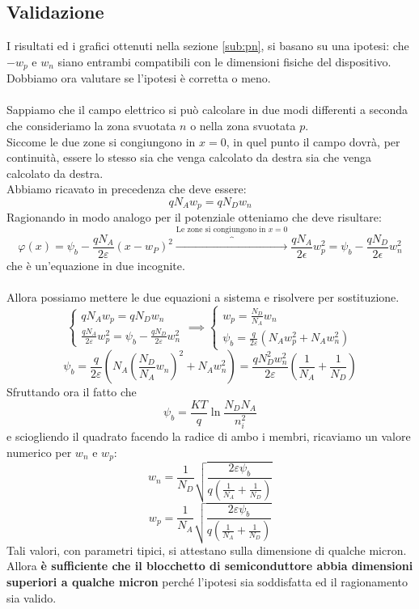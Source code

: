 \documentclass[../main.tex]{subfiles}
\begin{document}
	\subsection{Validazione}
	I risultati ed i grafici ottenuti nella sezione \ref{sub:pn}, si basano su una ipotesi: che $-w_p$ e $w_n$ siano entrambi compatibili con le dimensioni fisiche del dispositivo. \\
	Dobbiamo ora valutare se l’ipotesi è corretta o meno.\\\\
	Sappiamo che il campo elettrico si può calcolare in due modi differenti a seconda che consideriamo la zona svuotata $n$ o nella zona svuotata $p$. \\
	Siccome le due zone si congiungono in $x = 0$, in quel punto il campo dovrà, per continuità, essere lo stesso sia che venga calcolato da destra sia che venga calcolato da destra. \\
	Abbiamo ricavato in precedenza che deve essere:
	$$qN_A w_p = qN_D w_n$$
	Ragionando in modo analogo per il potenziale otteniamo che deve risultare:
	$$\varphi(x)=\psi_{b}-\frac{qN_{A}}{2\varepsilon}\left(x-w_{P}\right)^{2} \overbrace{\rightarrow}^{\text{Le zone si congiungono in }x=0} \frac{qN_A}{2\epsilon} w_p^2 = \psi_b - \frac{qN_D}{2\epsilon} w_n^2$$
	che è un’equazione in due incognite.\\\\
	Allora possiamo mettere le due equazioni a sistema e risolvere per sostituzione.
	$$\begin{cases} 
			qN_A w_p = qN_D w_n \\ 
			\frac{qN_A}{2\varepsilon} w_p^2 = \psi_b - \frac{qN_D}{2\varepsilon} w_n^2 
		\end{cases} 
		\implies 
		\begin{cases} 
			w_p = \frac{N_D}{N_A} w_n \\ 
			\psi_b = \frac{q}{2\varepsilon} \left( N_A w_p^2 + N_A w_n^2 \right) 
		\end{cases}$$
	$$\psi_b = \frac{q}{2\varepsilon} \left( N_A \left( \frac{N_D}{N_A} w_n \right)^2 + N_A w_n^2 \right) = \frac{qN_D^2 w_n^2}{2\varepsilon} \left( \frac{1}{N_A} + \frac{1}{N_D} \right)$$
	Sfruttando ora il fatto che
	$$\psi_b = \frac{KT}{q} \ln \frac{N_D N_A}{n_i^2}$$
	e sciogliendo il quadrato facendo la radice di ambo i membri, ricaviamo un valore numerico per $w_n$ e $w_p$:
	$$w_n = \frac{1}{N_D} \sqrt{\frac{2\varepsilon \psi_b}{q \left( \frac{1}{N_A} + \frac{1}{N_D} \right)}}$$
	$$w_p = \frac{1}{N_A} \sqrt{\frac{2\varepsilon \psi_b}{q \left( \frac{1}{N_A} + \frac{1}{N_D} \right)}}$$
	Tali valori, con parametri tipici, si attestano sulla dimensione di qualche micron. \\
	Allora \textbf{è sufficiente che il blocchetto di semiconduttore abbia dimensioni superiori a qualche micron} perché l’ipotesi sia soddisfatta ed il ragionamento sia valido.
\end{document}
